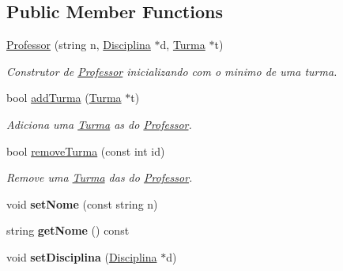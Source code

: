 \subsection*{Public Member Functions}
\begin{DoxyCompactItemize}
\item 
\hypertarget{class_professor_a8e20e8472f95da9e7dbbe043b2ca40c0}{\hyperlink{class_professor_a8e20e8472f95da9e7dbbe043b2ca40c0}{Professor} (string n, \hyperlink{class_disciplina}{Disciplina} $\ast$d, \hyperlink{class_turma}{Turma} $\ast$t)}\label{class_professor_a8e20e8472f95da9e7dbbe043b2ca40c0}

\begin{DoxyCompactList}\small\item\em Construtor de \hyperlink{class_professor}{Professor} inicializando com o minimo de uma turma. \end{DoxyCompactList}\item 
\hypertarget{class_professor_a4242c678534b7effaec214ad2f8a3079}{bool \hyperlink{class_professor_a4242c678534b7effaec214ad2f8a3079}{add\-Turma} (\hyperlink{class_turma}{Turma} $\ast$t)}\label{class_professor_a4242c678534b7effaec214ad2f8a3079}

\begin{DoxyCompactList}\small\item\em Adiciona uma \hyperlink{class_turma}{Turma} as do \hyperlink{class_professor}{Professor}. \end{DoxyCompactList}\item 
\hypertarget{class_professor_a1cc34746e255348252f50e0b6ab34e41}{bool \hyperlink{class_professor_a1cc34746e255348252f50e0b6ab34e41}{remove\-Turma} (const int id)}\label{class_professor_a1cc34746e255348252f50e0b6ab34e41}

\begin{DoxyCompactList}\small\item\em Remove uma \hyperlink{class_turma}{Turma} das do \hyperlink{class_professor}{Professor}. \end{DoxyCompactList}\item 
\hypertarget{class_professor_a07e9e250699c43012ccd79af3923b427}{void {\bfseries set\-Nome} (const string n)}\label{class_professor_a07e9e250699c43012ccd79af3923b427}

\item 
\hypertarget{class_professor_a10a5d663d8f31fcf4df25a56c622d7d4}{string {\bfseries get\-Nome} () const }\label{class_professor_a10a5d663d8f31fcf4df25a56c622d7d4}

\item 
\hypertarget{class_professor_a6670967a09f78b6d0016a2e3417c238f}{void {\bfseries set\-Disciplina} (\hyperlink{class_disciplina}{Disciplina} $\ast$d)}\label{class_professor_a6670967a09f78b6d0016a2e3417c238f}


\end{DoxyCompactItemize}
